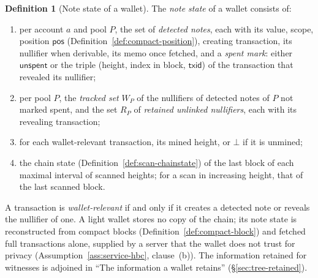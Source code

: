 \documentclass[11pt,a4paper]{article}
\theoremstyle{definition}
\newtheorem{definition}[theorem]{Definition}
\begin{document}
\begin{definition}[Note state of a wallet]\label{def:scan-state}
The \emph{note state} of a wallet consists of:
\begin{enumerate}[label=(\roman*)]
\item per account $a$ and pool $P$, the set of \emph{detected notes}, each
  with its value, scope, position $\mathsf{pos}$
  (Definition~\ref{def:compact-position}), creating transaction, its
  nullifier when derivable, its memo once fetched, and a \emph{spent mark}:
  either $\mathsf{unspent}$ or the triple (height, index in block,
  $\mathsf{txid}$) of the transaction that revealed its nullifier;
\item per pool $P$, the \emph{tracked set} $W_P$ of the nullifiers of
  detected notes of $P$ not marked spent, and the set $R_P$ of
  \emph{retained unlinked nullifiers}, each with its revealing transaction;
\item for each wallet-relevant transaction, its mined height, or $\bot$ if
  it is unmined;
\item the chain state (Definition~\ref{def:scan-chainstate}) of the last
  block of each maximal interval of scanned heights; for a scan in
  increasing height, that of the last scanned block.
\end{enumerate}
A transaction is \emph{wallet-relevant} if and only if it creates a
detected note or reveals the nullifier of one. A light wallet stores no copy
of the chain; its note state is reconstructed from compact blocks
(Definition~\ref{def:compact-block}) and fetched full transactions alone,
supplied by a server that the wallet does not trust for privacy
(Assumption~\ref{ass:service-hbc}, clause~(b)). The information retained
for witnesses is adjoined in ``The information a wallet retains''
(\S\ref{sec:tree-retained}).
\end{definition}
\end{document}
